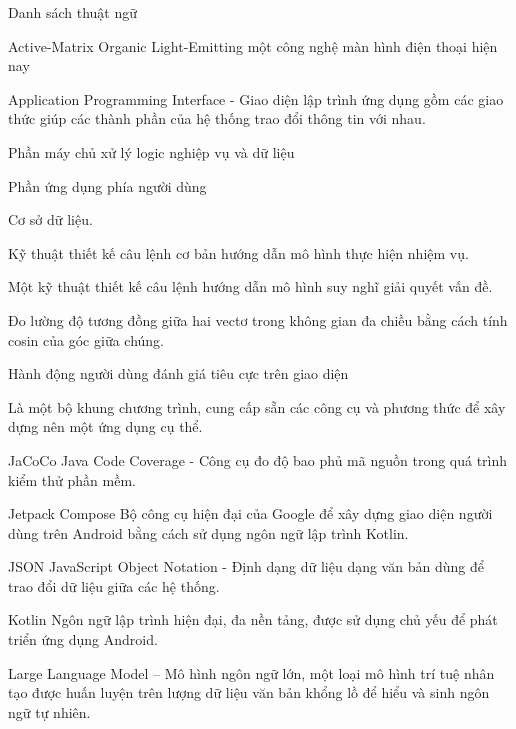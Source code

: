 \documentclass{uetgraduation}
\makeatletter
\newcommand\descriptionlabel[1]{\hspace\labelsep\normalfont\bfseries #1}%
\newenvironment{description}{%
        \list{}{%
            \labelwidth\z@ \itemindent-\leftmargin
            \let\makelabel\descriptionlabel
        }%
    }{\endlist}%
\makeatother
\begin{document}
\begin{contentlisting}
    \begin{contentlistingsection}{Danh sách thuật ngữ}
        \begin{description}
            \item[AMOLED] Active-Matrix Organic Light-Emitting một công nghệ màn hình điện thoại hiện nay
            \item[API] Application Programming Interface - Giao diện lập trình ứng dụng gồm các giao thức giúp các thành phần của hệ thống trao đổi thông tin với nhau.
            \item[Backend] Phần máy chủ xử lý logic nghiệp vụ và dữ liệu
            \item[Client] Phần ứng dụng phía người dùng
            \item[CSDL] Cơ sở dữ liệu. 
            \item[Minimal Prompt] Kỹ thuật thiết kế câu lệnh cơ bản hướng dẫn mô hình thực hiện nhiệm vụ.
            \item[Chain of Thoughts (CoT)] Một kỹ thuật thiết kế câu lệnh hướng dẫn mô hình suy nghĩ giải quyết vấn đề.
            \item[Cosine Similarity] Đo lường độ tương đồng giữa hai vectơ trong không gian đa chiều bằng cách tính cosin của góc giữa chúng.
            \item[downvote] Hành động người dùng đánh giá tiêu cực trên giao diện
            \item[framework] Là một bộ khung chương trình, cung cấp sẵn các công cụ và phương thức để xây dựng nên một ứng dụng cụ thể.
            \item{JaCoCo} Java Code Coverage - Công cụ đo độ bao phủ mã nguồn trong quá trình kiểm thử phần mềm.
            \item{Jetpack Compose} Bộ công cụ hiện đại của Google để xây dựng giao diện người dùng trên Android bằng cách sử dụng ngôn ngữ lập trình Kotlin.
            \item{JSON} JavaScript Object Notation - Định dạng dữ liệu dạng văn bản dùng để trao đổi dữ liệu giữa các hệ thống.
            \item{Kotlin} Ngôn ngữ lập trình hiện đại, đa nền tảng, được sử dụng chủ yếu để phát triển ứng dụng Android.
            \item[LLM] Large Language Model -- Mô hình ngôn ngữ lớn, một loại mô hình trí tuệ nhân tạo được huấn luyện trên lượng dữ liệu văn bản khổng lồ để hiểu và sinh ngôn ngữ tự nhiên.

\end{description}
\end{contentlistingsection}
\end{contentlisting}
\end{document}
